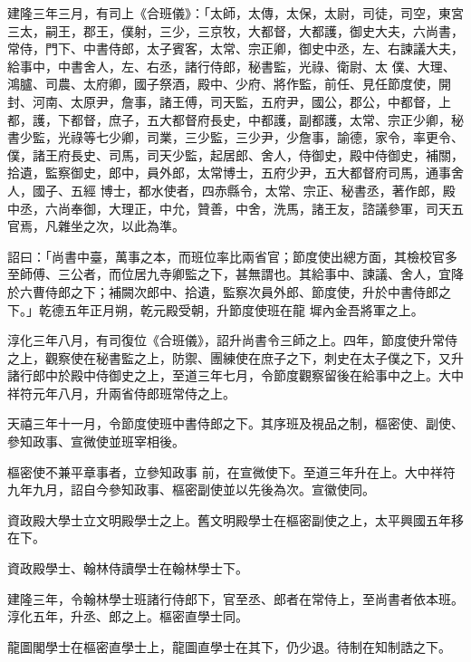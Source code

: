 \begin{pinyinscope}
 建隆三年三月，有司上《合班儀》：「太師，太傳，太保，太尉，司徒，司空，東宮三太，嗣王，郡王，僕射，三少，三京牧，大都督，大都護，御史大夫，六尚書，常侍，門下、中書侍郎，太子賓客，太常、宗正卿，御史中丞，左、右諫議大夫，給事中，中書舍人，左、右丞，諸行侍郎，秘書監，光祿、衛尉、太
 僕、大理、鴻臚、司農、太府卿，國子祭酒，殿中、少府、將作監，前任、見任節度使，開封、河南、太原尹，詹事，諸王傅，司天監，五府尹，國公，郡公，中都督，上都，護，下都督，庶子，五大都督府長史，中都護，副都護，太常、宗正少卿，秘書少監，光祿等七少卿，司業，三少監，三少尹，少詹事，諭德，家令，率更令、僕，諸王府長史、司馬，司天少監，起居郎、舍人，侍御史，殿中侍御史，補關，拾遺，監察御史，郎中，員外郎，太常博士，五府少尹，五大都督府司馬，通事舍人，國子、五經
 博士，都水使者，四赤縣令，太常、宗正、秘書丞，著作郎，殿中丞，六尚奉御，大理正，中允，贊善，中舍，洗馬，諸王友，諮議參軍，司天五官焉，凡雜坐之次，以此為準。



 詔曰：「尚書中臺，萬事之本，而班位率比兩省官；節度使出總方面，其檢校官多至師傅、三公者，而位居九寺卿監之下，甚無謂也。其給事中、諫議、舍人，宜降於六曹侍郎之下；補闕次郎中、拾遺，監察次員外郎、節度使，升於中書侍郎之下。」乾德五年正月朔，乾元殿受朝，升節度使班在龍
 墀內金吾將軍之上。



 淳化三年八月，有司復位《合班儀》，詔升尚書令三師之上。四年，節度使升常侍之上，觀察使在秘書監之上，防禦、團練使在庶子之下，刺史在太子僕之下，又升諸行郎中於殿中侍御史之上，至道三年七月，令節度觀察留後在給事中之上。大中祥符元年八月，升兩省侍郎班常侍之上。



 天禧三年十一月，令節度使班中書侍郎之下。其序班及視品之制，樞密使、副使、參知政事、宣微使並班宰相後。



 樞密使不兼平章事者，立參知政事
 前，在宣微使下。至道三年升在上。大中祥符九年九月，詔自今參知政事、樞密副使並以先後為次。宣徽使同。



 資政殿大學士立文明殿學士之上。舊文明殿學士在樞密副使之上，太平興國五年移在下。



 資政殿學士、翰林侍讀學士在翰林學士下。



 建隆三年，令翰林學士班諸行侍郎下，官至丞、郎者在常侍上，至尚書者依本班。淳化五年，升丞、郎之上。樞密直學士同。



 龍圖閣學士在樞密直學士上，龍圖直學士在其下，仍少退。待制在知制誥之下。




\end{pinyinscope}
